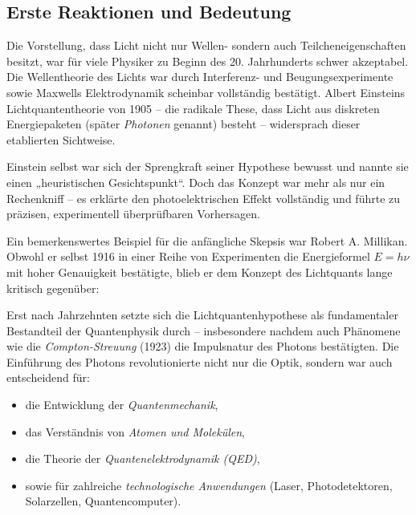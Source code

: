 \subsection{Erste Reaktionen und Bedeutung}

Die Vorstellung, dass Licht nicht nur Wellen- sondern auch Teilcheneigenschaften besitzt, war für viele Physiker zu Beginn des 20. Jahrhunderts schwer akzeptabel. Die Wellentheorie des Lichts war durch Interferenz- und Beugungsexperimente sowie Maxwells Elektrodynamik scheinbar vollständig bestätigt. Albert Einsteins Lichtquantentheorie von 1905 – die radikale These, dass Licht aus diskreten Energiepaketen (später \emph{Photonen} genannt) besteht – widersprach dieser etablierten Sichtweise.

Einstein selbst war sich der Sprengkraft seiner Hypothese bewusst und nannte sie einen „heuristischen Gesichtspunkt“. Doch das Konzept war mehr als nur ein Rechenkniff – es erklärte den photoelektrischen Effekt vollständig und führte zu präzisen, experimentell überprüfbaren Vorhersagen.

Ein bemerkenswertes Beispiel für die anfängliche Skepsis war Robert A. Millikan. Obwohl er selbst 1916 in einer Reihe von Experimenten die Energieformel \( E = h \nu \) mit hoher Genauigkeit bestätigte, blieb er dem Konzept des Lichtquants lange kritisch gegenüber:

Erst nach Jahrzehnten setzte sich die Lichtquantenhypothese als fundamentaler Bestandteil der Quantenphysik durch – insbesondere nachdem auch Phänomene wie die \emph{Compton-Streuung} (1923) die Impulsnatur des Photons bestätigten.
\newpage
\noindent
Die Einführung des Photons revolutionierte nicht nur die Optik, sondern war auch entscheidend für:
\begin{itemize}
	\item die Entwicklung der \emph{Quantenmechanik},
	\item das Verständnis von \emph{Atomen und Molekülen},
	\item die Theorie der \emph{Quantenelektrodynamik (QED)},
	\item sowie für zahlreiche \emph{technologische Anwendungen} (Laser, Photodetektoren, Solarzellen, Quantencomputer).
\end{itemize}

